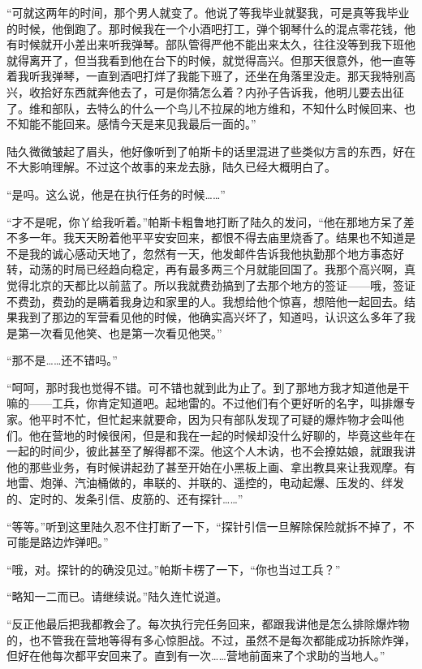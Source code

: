 “可就这两年的时间，那个男人就变了。他说了等我毕业就娶我，可是真等我毕业的时候，他倒跑了。那时候我在一个小酒吧打工，弹个钢琴什么的混点零花钱，他有时候就开小差出来听我弹琴。部队管得严他不能出来太久，往往没等到我下班他就得离开了，但当我看到他在台下的时候，就觉得高兴。但那天很意外，他一直等着我听我弹琴，一直到酒吧打烊了我能下班了，还坐在角落里没走。那天我特别高兴，收拾好东西就奔他去了，可是你猜怎么着？内孙子告诉我，他明儿要去出征了。维和部队，去特么的什么一个鸟儿不拉屎的地方维和，不知什么时候回来、也不知能不能回来。感情今天是来见我最后一面的。”

陆久微微皱起了眉头，他好像听到了帕斯卡的话里混进了些类似方言的东西，好在不大影响理解。不过这个故事的来龙去脉，陆久已经大概明白了。

“是吗。这么说，他是在执行任务的时候……”

“才不是呢，你丫给我听着。”帕斯卡粗鲁地打断了陆久的发问，“他在那地方呆了差不多一年。我天天盼着他平平安安回来，都恨不得去庙里烧香了。结果也不知道是不是我的诚心感动天地了，忽然有一天，他发邮件告诉我他执勤那个地方事态好转，动荡的时局已经趋向稳定，再有最多两三个月就能回国了。我那个高兴啊，真觉得北京的天都比以前蓝了。所以我就费劲搞到了去那个地方的签证——哦，签证不费劲，费劲的是瞒着我身边和家里的人。我想给他个惊喜，想陪他一起回去。结果我到了那边的军营看见他的时候，他确实高兴坏了，知道吗，认识这么多年了我是第一次看见他笑、也是第一次看见他哭。”

“那不是……还不错吗。”

“呵呵，那时我也觉得不错。可不错也就到此为止了。到了那地方我才知道他是干嘛的——工兵，你肯定知道吧。起地雷的。不过他们有个更好听的名字，叫排爆专家。他平时不忙，但忙起来就要命，因为只有部队发现了可疑的爆炸物才会叫他们。他在营地的时候很闲，但是和我在一起的时候却没什么好聊的，毕竟这些年在一起的时间少，彼此甚至了解得都不深。他这个人木讷，也不会撩姑娘，就跟我讲他的那些业务，有时候讲起劲了甚至开始在小黑板上画、拿出教具来让我观摩。有地雷、炮弹、汽油桶做的，串联的、并联的、遥控的，电动起爆、压发的、绊发的、定时的、发条引信、皮筋的、还有探针……”

“等等。”听到这里陆久忍不住打断了一下，“探针引信一旦解除保险就拆不掉了，不可能是路边炸弹吧。”

“哦，对。探针的的确没见过。”帕斯卡楞了一下，“你也当过工兵？”

“略知一二而已。请继续说。”陆久连忙说道。

“反正他最后把我都教会了。每次执行完任务回来，都跟我讲他是怎么排除爆炸物的，也不管我在营地等得有多心惊胆战。不过，虽然不是每次都能成功拆除炸弹，但好在他每次都平安回来了。直到有一次……营地前面来了个求助的当地人。”

